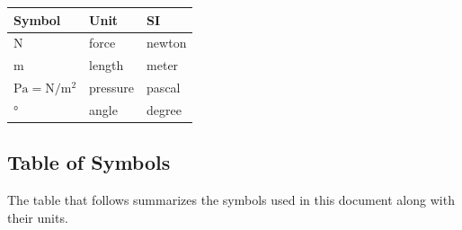 \documentclass[12pt]{article}
\renewcommand{\arraystretch}{1}
\begin{document}
\renewcommand{\arraystretch}{1.2}
\setlength{\tabcolsep}{20pt}
\begin{tabular}{  l  l  l  }
\hline
\textbf{Symbol} & \textbf{Unit} & \textbf{SI} \\
\hline
\si{\newton} & force & newton \\
\si{\meter} & length & meter \\
$\si{\pascal}=\si{\newton\per\square\meter}$ & pressure & pascal \\
\si{\degree} & angle & degree  \\
\hline
\end{tabular}
\renewcommand{\arraystretch}{1}



\subsection{Table of Symbols}


The table that follows summarizes the symbols used in this document along with 
their units. 
\end{document}
